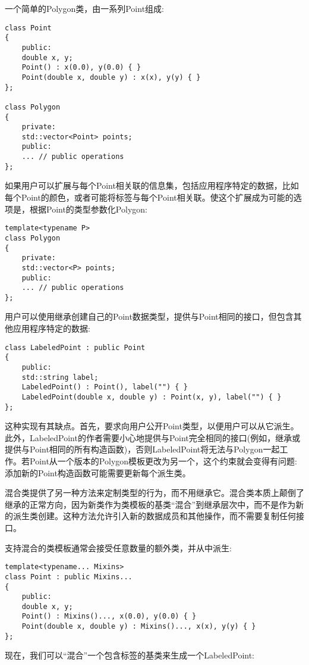 
一个简单的Polygon类，由一系列Point组成:

\begin{lstlisting}[style=styleCXX]
class Point
{
	public:
	double x, y;
	Point() : x(0.0), y(0.0) { }
	Point(double x, double y) : x(x), y(y) { }
};

class Polygon
{
	private:
	std::vector<Point> points;
	public:
	... // public operations
};
\end{lstlisting}

如果用户可以扩展与每个Point相关联的信息集，包括应用程序特定的数据，比如每个Point的颜色，或者可能将标签与每个Point相关联。使这个扩展成为可能的选项是，根据Point的类型参数化Polygon:

\begin{lstlisting}[style=styleCXX]
template<typename P>
class Polygon
{
	private:
	std::vector<P> points;
	public:
	... // public operations
};
\end{lstlisting}

用户可以使用继承创建自己的Point数据类型，提供与Point相同的接口，但包含其他应用程序特定的数据:

\begin{lstlisting}[style=styleCXX]
class LabeledPoint : public Point
{
	public:
	std::string label;
	LabeledPoint() : Point(), label("") { }
	LabeledPoint(double x, double y) : Point(x, y), label("") { }
};
\end{lstlisting}

这种实现有其缺点。首先，要求向用户公开Point类型，以便用户可以从它派生。此外，LabeledPoint的作者需要小心地提供与Point完全相同的接口(例如，继承或提供与Point相同的所有构造函数)，否则LabeledPoint将无法与Polygon一起工作。若Point从一个版本的Polygon模板更改为另一个，这个约束就会变得有问题:添加新的Point构造函数可能需要更新每个派生类。

混合类提供了另一种方法来定制类型的行为，而不用继承它。混合类本质上颠倒了继承的正常方向，因为新类作为类模板的基类“混合”到继承层次中，而不是作为新的派生类创建。这种方法允许引入新的数据成员和其他操作，而不需要复制任何接口。

支持混合的类模板通常会接受任意数量的额外类，并从中派生:

\begin{lstlisting}[style=styleCXX]
template<typename... Mixins>
class Point : public Mixins...
{
	public:
	double x, y;
	Point() : Mixins()..., x(0.0), y(0.0) { }
	Point(double x, double y) : Mixins()..., x(x), y(y) { }
};
\end{lstlisting}

现在，我们可以“混合”一个包含标签的基类来生成一个LabeledPoint:


